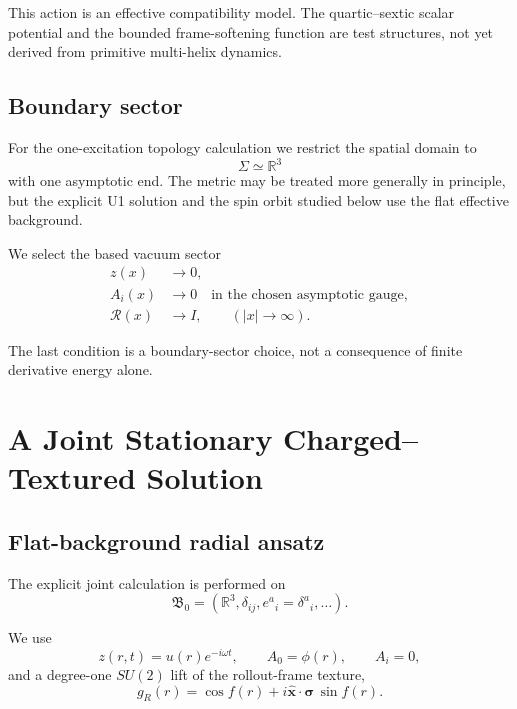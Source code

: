 \documentclass[11pt]{article}
\begin{document}
This action is an effective compatibility model. The quartic--sextic scalar potential and the bounded frame-softening function are test structures, not yet derived from primitive multi-helix dynamics.

\subsection{Boundary sector}

For the one-excitation topology calculation we restrict the spatial domain to
\begin{equation}
\Sigma\simeq\mathbb R^3
\end{equation}
with one asymptotic end. The metric may be treated more generally in principle, but the explicit U1 solution and the spin orbit studied below use the flat effective background.

We select the based vacuum sector
\begin{align}
z(x)&\to0,\\
A_i(x)&\to0
\quad\text{in the chosen asymptotic gauge},\\
\mathcal R(x)&\to I,
\qquad
(|x|\to\infty).
\end{align}

The last condition is a boundary-sector choice, not a consequence of finite derivative energy alone.

\section{A Joint Stationary Charged--Textured Solution}

\subsection{Flat-background radial ansatz}

The explicit joint calculation is performed on
\begin{equation}
\boxed{
\mathfrak B_0
=
(\mathbb R^3,\delta_{ij},e^a{}_i=\delta^a{}_i,\ldots).
}
\end{equation}

We use
\begin{equation}
z(r,t)
=
u(r)e^{-i\omega t},
\qquad
A_0=\phi(r),
\qquad
A_i=0,
\end{equation}
and a degree-one \(SU(2)\) lift of the rollout-frame texture,
\begin{equation}
g_R(r)
=
\cos f(r)
+
i\hat{\bm x}\cdot\bm\sigma\,\sin f(r).
\end{equation}
\end{document}

